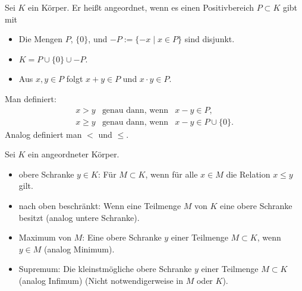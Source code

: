 \documentclass[a4paper,12pt,DIV15]{scrartcl}
\begin{document}
\begin{defn}[Anordnung]
Sei $K$ ein Körper. Er heißt {\color{red} angeordnet}, wenn es einen {\color{red}
Positivbereich} $P \subset K$ gibt mit
\begin{itemize}
\item Die Mengen $P$, $\{ 0 \}$, und $-P:=\{-x\;|\;x \in P \}$ sind
disjunkt. 
\item $K = P \cup \{ 0 \} \cup -P$.
\item Aus $x,y \in P$ folgt $x+y \in P$ und $x \cdot y \in P$. 
\end{itemize}
Man definiert:
\begin{eqnarray*}
 x >y& \text{genau dann, wenn}& x-y\in P,\\
 x \geq y&  \text{genau dann, wenn} &x-y \in P \cup \{ 0 \}.
\end{eqnarray*}
Analog definiert man $<$ und $\leq$. 
\end{defn}

\begin{defn}[Schranken]
Sei $K$ ein angeordneter Körper.
\begin{itemize}
\item {\color{red} obere Schranke} $y\in K$: Für $M \subset K$, wenn für alle $x\in M$ die Relation $x \leq y$ gilt.
\item nach oben {\color{red} beschränkt}: Wenn eine Teilmenge $M$ von $K$ eine obere Schranke besitzt (analog {\color{red} untere Schranke}).
\item {\color{red} Maximum} von $M$: Eine obere Schranke $y$ einer Teilmenge $M \subset K$, wenn $y\in M$ (analog {\color{red} Minimum}).
\item {\color{red} Supremum}: Die kleinstmögliche obere Schranke $y$ einer Teilmenge $M \subset K$ (analog {\color{red} Infimum}) 
(Nicht notwendigerweise in $M$ oder $K$).  
\end{itemize}
\end{defn}
\end{document}
